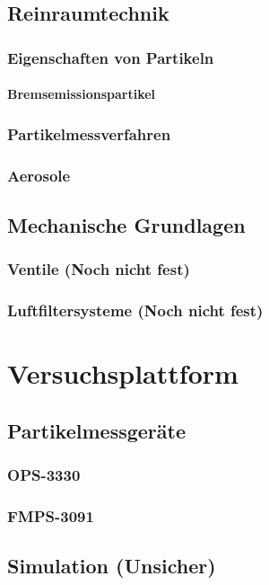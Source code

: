\section{Reinraumtechnik}
\subsection{Eigenschaften von Partikeln}
\subsubsection{Bremsemissionspartikel}
\subsection{Partikelmessverfahren}
\subsection{Aerosole}

\section{Mechanische Grundlagen}
\subsection{Ventile (Noch nicht fest)}
\subsection{Luftfiltersysteme (Noch nicht fest)}


\chapter{Versuchsplattform}\label{ch:platform}
\section{Partikelmessger\"{a}te}
\subsection{OPS-3330}
\subsection{FMPS-3091}

\section{Simulation (Unsicher)}
